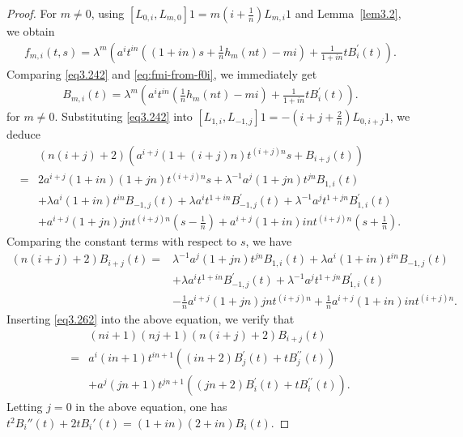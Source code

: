 \documentclass[a4paper]{amsart}
\numberwithin{equation}{section}
\begin{document}
\begin{proof}
For $m\neq0$, using 
$ 
[L_{0,i},L_{m,0}]1=m\left(i+\frac1n\right)L_{m,i}1
$ 
  and Lemma~\ref{lem3.2}, we obtain
\begin{align}\label{eq:fmi-from-f0i}
f_{m,i}(t,s)
=\lambda^m\left(a^it^{in}
\left((1+in)s+\frac1n h_m(nt)-mi\right)+\frac{1}{1+in}tB_i^\prime(t)\right).
\end{align}
Comparing \eqref{eq3.242} and \eqref{eq:fmi-from-f0i}, we immediately get
\begin{align}\label{eq3.262}
    B_{m,i}(t)=\lambda^m\left(a^it^{in}
\left(\frac1n h_m(nt)-mi\right)+\frac{1}{1+in}tB_i^\prime(t)\right).
\end{align}
for $m\neq0$.
Substituting  \eqref{eq3.242}  into
$[L_{1,i},L_{-1,j}]1=-(i+j+\frac{2}{n})L_{0,i+j}1$, we deduce
\begin{align*}
&(n(i+j)+2)\left(a^{i+j}(1+(i+j)n)t^{(i+j)n}s+B_{i+j}(t)\right)
\\=&2a^{i+j}(1+in)(1+jn)t^{(i+j)n}s+\lambda^{-1}a^j(1+jn)t^{jn}B_{1,i}(t)
\\&+\lambda a^i(1+in)t^{in}B_{-1,j}(t)+\lambda a^it^{1+in}B_{-1,j}^\prime(t)
+\lambda^{-1} a^jt^{1+jn}B_{1,i}^\prime(t)
\\&
+a^{i+j}(1+jn)jnt^{(i+j)n}(s-\frac{1}{n})+a^{i+j}(1+in)int^{(i+j)n}(s+\frac{1}{n}).
\end{align*}
Comparing the constant terms with respect to $s$, we have
\begin{align*}
(n(i+j)+2)B_{i+j}(t)
 =&\lambda^{-1}a^j(1+jn)t^{jn}B_{1,i}(t)
+\lambda a^i(1+in)t^{in}B_{-1,j}(t)
\\&+\lambda a^it^{1+in}B_{-1,j}^\prime(t)
+\lambda^{-1} a^jt^{1+jn}B_{1,i}^\prime(t)
\\&
-\frac{1}{n}a^{i+j}(1+jn)jnt^{(i+j)n} +\frac{1}{n}a^{i+j}(1+in)int^{(i+j)n}.
\end{align*}
Inserting \eqref{eq3.262} into the above equation, we verify that
\begin{align}\label{Bij3.27}
&(ni+1)(nj+1)(n(i+j)+2)B_{i+j}(t)\\
={}&a^i(in+1)t^{in+1}\left((in+2)B^\prime_j(t)+tB^{\prime\prime}_j(t)\right)\nonumber\\
&+a^j(jn+1)t^{jn+1}\left((jn+2)B^\prime_i(t)+tB^{\prime\prime}_i(t)\right).\nonumber
\end{align}
Letting $j=0$ in  the above equation, one has
$
t^2B_i''(t)+2tB_i'(t)=(1+in)(2+in)B_i(t).
$


\end{proof}
\end{document}
